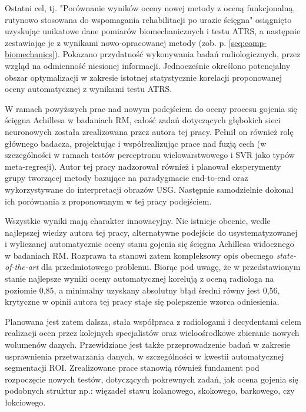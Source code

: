 Ostatni cel, tj. "Porównanie wyników oceny nowej metody z oceną funkcjonalną, rutynowo stosowana do wspomagania rehabilitacji po urazie ścięgna" osiągnięto uzyskując unikatowe dane pomiarów biomechanicznych i testu ATRS, a następnie zestawiając je z wynikami nowo-opracowanej metody (zob. p. \ref{seq:comp-biomechanics}). Pokazano przydatność wykonywania badań radiologicznych, przez wzgląd na odmienność niesionej informacji. Jednocześnie określono potencjalny obszar optymalizacji w zakresie istotnej statystycznie korelacji proponowanej oceny automatycznej z wynikami testu ATRS.  

W ramach powyższych prac nad nowym podejściem do oceny procesu gojenia się ścięgna Achillesa w badaniach RM, całość zadań dotyczących głębokich sieci neuronowych została zrealizowana przez autora tej pracy. Pełnił on również rolę głównego badacza, projektując i współrealizując prace nad fuzją cech (w szczególności w ramach testów perceptronu wielowarstwowego i SVR jako typów meta-regresji). Autor tej pracy nadzorował również i planował eksperymenty grupy tworzącej metody bazujące na paradygmacie end-to-end oraz wykorzystywane do interpretacji obrazów USG. Następnie samodzielnie dokonał ich porównania z proponowanym w tej pracy podejściem. 

Wszystkie wyniki mają charakter innowacyjny. Nie istnieje obecnie, wedle najlepszej wiedzy autora tej pracy, alternatywne podejście do usystematyzowanej i wyliczanej automatycznie oceny stanu gojenia się ścięgna Achillesa widocznego w badaniach RM. Rozprawa ta stanowi zatem kompleksowy opis obecnego \textit{state-of-the-art} dla przedmiotowego problemu. Biorąc pod uwagę, że w przedstawionym stanie najlepsze wyniki oceny automatycznej korelują z oceną radiologa na poziomie 0,85, a minimalny uzyskany absolutny błąd średni równy jest 0,56, krytyczne w opinii autora tej pracy staje się polepszenie wzorca odniesienia. 

Planowana jest zatem dalsza, stała współpraca z radiologami i decydentami celem realizacji ocen przez kolejnych specjalistów oraz wieloośrodkowe zbieranie nowych wolumenów danych. Przewidziane jest także przeprowadzenie badań w zakresie usprawnienia przetwarzania danych, w szczególności w kwestii automatycznej segmentacji ROI. Zrealizowane prace stanowią również fundament pod rozpoczęcie nowych testów, dotyczących pokrewnych zadań, jak ocena gojenia się podobnych struktur np.: więzadeł stawu kolanowego, skokowego, barkowego, czy łokciowego. 

